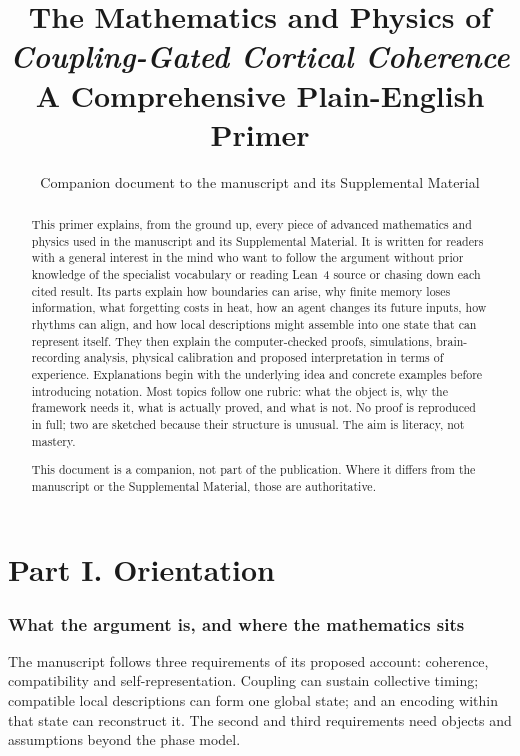 \documentclass[11pt]{article}
\title{The Mathematics and Physics of \\ \emph{Coupling-Gated Cortical Coherence}\\[4pt]
\large A Comprehensive Plain-English Primer}
\author{Companion document to the manuscript and its Supplemental Material}
\date{}
\begin{document}
\maketitle

\begin{abstract}
\noindent
This primer explains, from the ground up, every piece of advanced mathematics
and physics used in the manuscript and its Supplemental Material. It is written for readers with a
general interest in the mind who want to follow the argument without prior
knowledge of the specialist vocabulary or reading Lean~4 source
or chasing down each cited result. Its parts explain how boundaries can arise,
why finite memory loses information, what forgetting costs in heat, how an
agent changes its future inputs, how rhythms can align, and how local
descriptions might assemble into one state that can represent itself.
They then explain the computer-checked proofs, simulations,
brain-recording analysis, physical calibration and proposed interpretation in
terms of experience. Explanations begin with the underlying idea and concrete
examples before introducing notation. Most topics follow one rubric: what the object is,
why the framework needs it, what is actually proved, and what is not.
No proof is reproduced in full; two are sketched because their structure is
unusual. The aim is literacy, not mastery.

\medskip
\noindent
This document is a companion, not part of the publication. Where it differs
from the manuscript or the Supplemental Material, those are authoritative.
\end{abstract}

\tableofcontents
\newpage

\part*{Part I. Orientation}
\section{What the argument is, and where the mathematics sits}

The manuscript follows three requirements of its proposed account:
coherence, compatibility and self-representation. Coupling can sustain
collective timing; compatible local descriptions can form one global state;
and an encoding within that state can reconstruct it. The second and third
requirements need objects and assumptions beyond the phase model.
\end{document}
